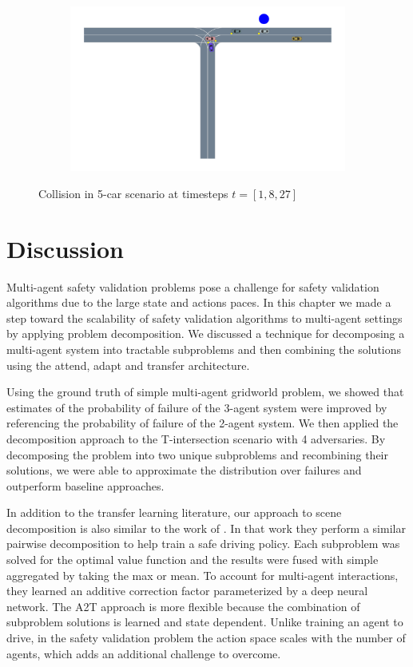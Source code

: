 \begin{figure}
\begin{subfigure}[t]{0.7\textwidth}
    \includegraphics[width=\textwidth, trim={2cm 5cm 1cm 0},clip]{figures/problem_decomposition/f2_27.pdf}
\end{subfigure}
    \caption{Collision in 5-car scenario at timesteps $t=[1,8,27]$}
    \label{fig:five_car_collision2}
    \vspace{-0.2in}
\end{figure}


\section{Discussion}

Multi-agent safety validation problems pose a challenge for safety validation algorithms due to the large state and actions paces. In this chapter we made a step toward the scalability of safety validation algorithms to multi-agent settings by applying problem decomposition. We discussed a technique for decomposing a multi-agent system into tractable subproblems and then combining the solutions using the attend, adapt and transfer architecture. 

Using the ground truth of simple multi-agent gridworld problem, we showed that estimates of the probability of failure of the \num{3}-agent system were improved by referencing the probability of failure of the \num{2}-agent system. We then applied the decomposition approach to the T-intersection scenario with \num{4} adversaries. By decomposing the problem into two unique subproblems and recombining their solutions, we were able to approximate the distribution over failures and outperform baseline approaches. 

In addition to the transfer learning literature, our approach to scene decomposition is also similar to the work of \textcite{bouton2019decomposition}. In that work they perform a similar pairwise decomposition to help train a safe driving policy. Each subproblem was solved for the optimal value function and the results were fused with simple aggregated by taking the max or mean. To account for multi-agent interactions, they learned an additive correction factor parameterized by a deep neural network. The A2T approach is more flexible because the combination of subproblem solutions is learned and state dependent. Unlike training an agent to drive, in the safety validation problem the action space scales with the number of agents, which adds an additional challenge to overcome.

